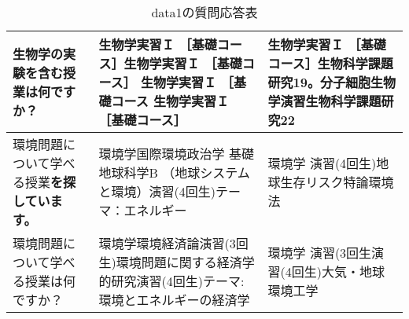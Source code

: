 \begin{table}[h!]
\begin{tabular}{|p{4cm}|p{6cm}|p{6cm}|}
        生物学の\textbf{実験を含む}授業は何ですか？ & 生物学実習Ｉ ［基礎コース］生物学実習Ｉ ［基礎コース］ 生物学実習Ｉ ［基礎コース 生物学実習Ｉ ［基礎コース］ & 生物学実習Ｉ ［基礎コース］生物科学課題研究19。分子細胞生物学演習生物科学課題研究22 \\ \hline
        環境問題について学べる授業\textbf{を探しています。} & 環境学国際環境政治学 基礎地球科学B （地球システムと環境）演習(4回生)テーマ：エネルギー & 環境学 演習(4回生)地球生存リスク特論環境法 \\ \hline
        環境問題について学べる授業は何ですか？ & 環境学環境経済論演習(3回生)環境問題に関する経済学的研究演習(4回生)テーマ:環境とエネルギーの経済学 & 環境学 演習(3回生演習(4回生)大気・地球環境工学 \\ \hline
    \end{tabular}
    \caption{data1の質問応答表}
\end{table}




